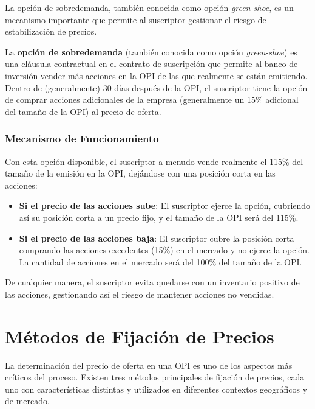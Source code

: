 La opción de sobredemanda, también conocida como opción \textit{green-shoe}, es un mecanismo importante que permite al suscriptor gestionar el riesgo de estabilización de precios.

\begin{definicion}
La \textbf{opción de sobredemanda} (también conocida como opción \textit{green-shoe}) es una cláusula contractual en el contrato de suscripción que permite al banco de inversión vender más acciones en la OPI de las que realmente se están emitiendo. Dentro de (generalmente) 30 días después de la OPI, el suscriptor tiene la opción de comprar acciones adicionales de la empresa (generalmente un 15\% adicional del tamaño de la OPI) al precio de oferta.
\end{definicion}

\subsubsection{Mecanismo de Funcionamiento}

Con esta opción disponible, el suscriptor a menudo vende realmente el 115\% del tamaño de la emisión en la OPI, dejándose con una posición corta en las acciones:

\begin{itemize}
\item \textbf{Si el precio de las acciones sube}: El suscriptor ejerce la opción, cubriendo así su posición corta a un precio fijo, y el tamaño de la OPI será del 115\%.
\item \textbf{Si el precio de las acciones baja}: El suscriptor cubre la posición corta comprando las acciones excedentes (15\%) en el mercado y no ejerce la opción. La cantidad de acciones en el mercado será del 100\% del tamaño de la OPI.
\end{itemize}

De cualquier manera, el suscriptor evita quedarse con un inventario positivo de las acciones, gestionando así el riesgo de mantener acciones no vendidas.

\section{Métodos de Fijación de Precios}

La determinación del precio de oferta en una OPI es uno de los aspectos más críticos del proceso. Existen tres métodos principales de fijación de precios, cada uno con características distintas y utilizados en diferentes contextos geográficos y de mercado.


